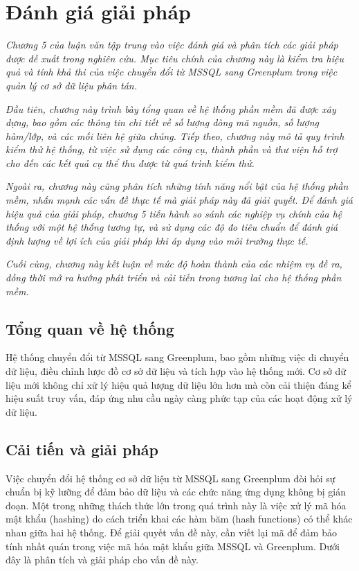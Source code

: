 

\section{Đánh giá giải pháp}


\textit{Chương 5 của luận văn tập trung vào việc đánh giá và phân tích các giải pháp được đề xuất trong nghiên cứu. Mục tiêu chính của chương này là kiểm tra hiệu quả và tính khả thi của việc chuyển đổi từ MSSQL sang Greenplum trong việc quản lý cơ sở dữ liệu phân tán.}

\textit{Đầu tiên, chương này trình bày tổng quan về hệ thống phần mềm đã được xây dựng, bao gồm các thông tin chi tiết về số lượng dòng mã nguồn, số lượng hàm/lớp, và các mối liên hệ giữa chúng. Tiếp theo, chương này mô tả quy trình kiểm thử hệ thống, từ việc sử dụng các công cụ, thành phần và thư viện hỗ trợ cho đến các kết quả cụ thể thu được từ quá trình kiểm thử.}

\textit{Ngoài ra, chương này cũng phân tích những tính năng nổi bật của hệ thống phần mềm, nhấn mạnh các vấn đề thực tế mà giải pháp này đã giải quyết. Để đánh giá hiệu quả của giải pháp, chương 5 tiến hành so sánh các nghiệp vụ chính của hệ thống với một hệ thống tương tự, và sử dụng các độ đo tiêu chuẩn để đánh giá định lượng về lợi ích của giải pháp khi áp dụng vào môi trường thực tế.}

\textit{Cuối cùng, chương này kết luận về mức độ hoàn thành của các nhiệm vụ đề ra, đồng thời mở ra hướng phát triển và cải tiến trong tương lai cho hệ thống phần mềm.}


\subsection{Tổng quan về hệ thống} 

Hệ thống chuyển đổi từ MSSQL sang Greenplum, bao gồm những việc di chuyển dữ liệu, điều chỉnh lược đồ cơ sở dữ liệu và tích hợp vào hệ thống mới. Cơ sở dữ liệu mới không chỉ xử lý hiệu quả lượng dữ liệu lớn hơn mà còn cải thiện đáng kể hiệu suất truy vấn, đáp ứng nhu cầu ngày càng phức tạp của các hoạt động xử lý dữ liệu.


\subsection{Cải tiến và giải pháp}

Việc chuyển đổi hệ thống cơ sở dữ liệu từ MSSQL sang Greenplum đòi hỏi sự chuẩn bị kỹ lưỡng để đảm bảo dữ liệu và các chức năng ứng dụng không bị gián đoạn. Một trong những thách thức lớn trong quá trình này là việc xử lý mã hóa mật khẩu (hashing) do cách triển khai các hàm băm (hash functions) có thể khác nhau giữa hai hệ thống. Để giải quyết vấn đề này, cần viết lại mã để đảm bảo tính nhất quán trong việc mã hóa mật khẩu giữa MSSQL và Greenplum. Dưới đây là phân tích và giải pháp cho vấn đề này.


